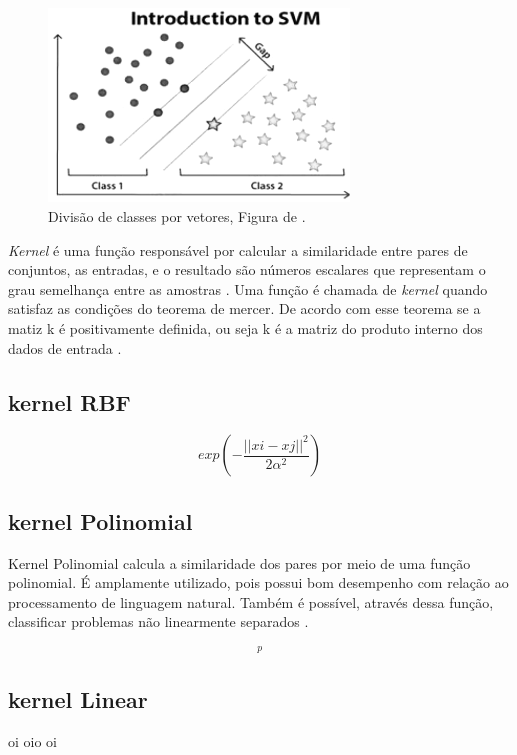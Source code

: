 \begin{figure}[h]
    \centering
    \includegraphics[width=8cm]{figuras/SVM/SVM_1.png}
    \caption{Divisão de classes por vetores, Figura de \cite{BattaMahesh2018}.}
    \label{fig:SVM_1}
\end{figure}

\textit{Kernel} é uma função responsável por calcular a similaridade entre pares de conjuntos, as entradas, e o resultado são números
escalares que representam o grau semelhança entre as amostras \cite{noronha2016implementaccao}. Uma função é chamada de \textit{kernel} quando satisfaz as condições do teorema de mercer. 
De acordo com esse teorema se a matiz k é positivamente definida, ou seja k é a matriz do produto interno dos dados de entrada \cite{falcao2017aplicaccao}.

\subsection{kernel RBF}

\begin{equation}
  exp\left (-\frac{||xi - xj||^2}{2\alpha^2}  \right )
  \label{eq:polinK}
\end{equation}

\subsection{kernel Polinomial}

Kernel Polinomial calcula a similaridade dos pares por meio de uma função polinomial. É amplamente utilizado, pois possui bom desempenho com relação ao processamento de linguagem natural. Também é 
possível, através dessa função, classificar problemas não linearmente separados \cite{noronha2016implementaccao}. 

\begin{equation}
  [(xi\cdot xj) + 1]^p
  \label{eq:polinK}
\end{equation}


\subsection{kernel Linear}
oi oio oi